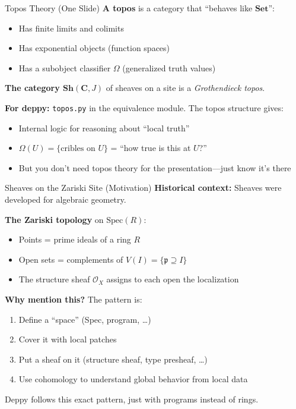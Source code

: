 \documentclass[aspectratio=169,10pt]{beamer}
\newcommand{\Oscr}{\mathcal{O}}
\newcommand{\Set}{\mathbf{Set}}
\begin{document}
\begin{frame}{Topos Theory (One Slide)}
\textbf{A topos} is a category that ``behaves like $\Set$'':
\begin{itemize}
  \item Has finite limits and colimits
  \item Has exponential objects (function spaces)
  \item Has a subobject classifier $\Omega$ (generalized truth values)
\end{itemize}

\textbf{The category $\mathbf{Sh}(\mathbf{C}, J)$} of sheaves on a site is a \emph{Grothendieck topos}.

\vspace{0.3em}
\textbf{For deppy:} \texttt{topos.py} in the equivalence module. The topos structure gives:
\begin{itemize}
  \item Internal logic for reasoning about ``local truth''
  \item $\Omega(U) = \{\text{cribles on } U\}$ = ``how true is this at $U$?''
  \item But you don't need topos theory for the presentation---just know it's there
\end{itemize}
\end{frame}


\begin{frame}{Sheaves on the Zariski Site (Motivation)}
\textbf{Historical context:} Sheaves were developed for algebraic geometry.

\textbf{The Zariski topology} on $\text{Spec}(R)$:
\begin{itemize}
  \item Points = prime ideals of a ring $R$
  \item Open sets = complements of $V(I) = \{\mathfrak{p} \supseteq I\}$
  \item The structure sheaf $\Oscr_X$ assigns to each open the localization
\end{itemize}

\textbf{Why mention this?} The pattern is:
\begin{enumerate}
  \item Define a ``space'' (Spec, program, \ldots)
  \item Cover it with local patches
  \item Put a sheaf on it (structure sheaf, type presheaf, \ldots)
  \item Use cohomology to understand global behavior from local data
\end{enumerate}

Deppy follows this exact pattern, just with programs instead of rings.
\end{frame}
\end{document}
